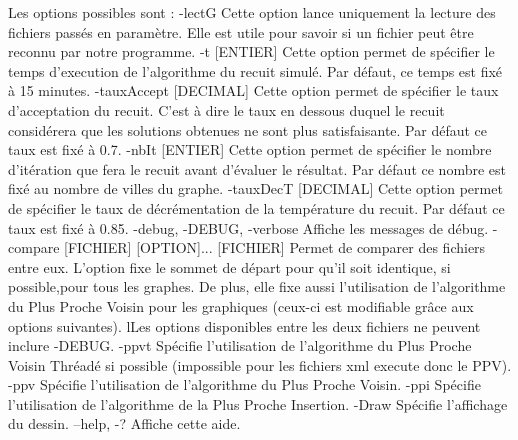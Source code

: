 \documentclass{article}
\begin{document}
Les options possibles sont :
-lectG 											Cette option lance uniquement la lecture des fichiers passés en paramètre. Elle est utile pour savoir si un fichier peut être reconnu par notre programme.
-t [ENTIER]										Cette option permet de spécifier le temps d'execution de l'algorithme du recuit simulé. Par défaut, ce temps est fixé à 15 minutes.
-tauxAccept [DECIMAL]							Cette option permet de spécifier le taux d'acceptation du recuit. C'est à dire le taux en dessous duquel le recuit considérera que les solutions obtenues ne sont plus satisfaisante. Par défaut ce taux est fixé à 0.7.
-nbIt [ENTIER]									Cette option permet de spécifier le nombre d'itération que fera le recuit avant d'évaluer le résultat. Par défaut ce nombre est fixé au nombre de villes du graphe.
-tauxDecT [DECIMAL]								Cette option permet de spécifier le taux de décrémentation de la température du recuit. Par défaut ce taux est fixé à 0.85.
-debug, -DEBUG, -verbose						Affiche les messages de débug.
-compare [FICHIER] [OPTION]... [FICHIER]		Permet de comparer des fichiers entre eux. L'option fixe le sommet de départ pour qu'il soit identique, si possible,pour tous les graphes. De plus, elle fixe aussi l'utilisation de l'algorithme du Plus Proche Voisin pour les graphiques (ceux-ci est modifiable grâce aux options suivantes). lLes options disponibles entre les deux fichiers ne peuvent inclure -DEBUG.
   -ppvt						Spécifie l'utilisation de l'algorithme du Plus Proche Voisin Thréadé si possible (impossible pour les fichiers xml execute donc le PPV).
   -ppv							Spécifie l'utilisation de l'algorithme du Plus Proche Voisin.
   -ppi							Spécifie l'utilisation de l'algorithme de la Plus Proche Insertion.
   -Draw						Spécifie l'affichage du dessin.
   --help, -?						Affiche cette aide.
\end{document}
